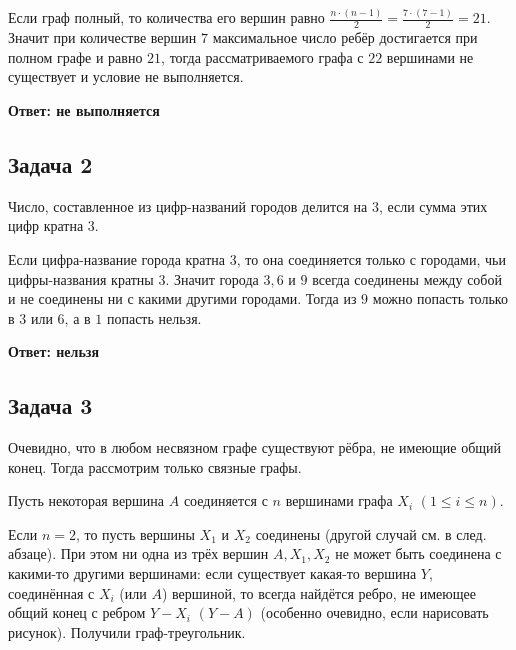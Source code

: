 \documentclass[a4paper,14pt]{article} %
\begin{document}
Если граф полный, то количества его вершин равно $\frac{n\cdot (n-1)}{2} = \frac{7\cdot (7-1)}{2} = 21$. Значит при количестве вершин $7$ максимальное число ребёр достигается при полном графе и равно $21$, тогда рассматриваемого графа с $22$ вершинами не существует и условие не выполняется.

\begin{flushright}
\begin{large}
\textbf {Ответ: не выполняется}
\end{large}
\end{flushright}

\begin{center}
\subsection{Задача 2}
\end{center}

Число, составленное из цифр-названий городов делится на $3$, если сумма этих цифр кратна 3.

Если цифра-название города кратна $3$, то она соединяется только с городами, чьи цифры-названия кратны 3. Значит города $3, 6$ и $9$ всегда соединены между собой и не соединены ни с какими другими городами. Тогда из $9$ можно попасть только в $3$ или $6$, а в $1$ попасть нельзя.

\begin{flushright}
\begin{large}
\textbf {Ответ: нельзя}
\end{large}
\end{flushright}
\newpage
\begin{center}
\subsection{Задача 3}
\end{center}

Очевидно, что в любом несвязном графе существуют рёбра, не имеющие общий конец. Тогда рассмотрим только связные графы.

Пусть некоторая вершина $A$ соединяется с $n$ вершинами графа $X_i$ $(1 \leqslant i \leqslant n)$.

Если $n = 2$, то пусть вершины $X_1$ и $X_2$ соединены (другой случай см. в след. абзаце). При этом ни одна из трёх вершин $A, X_1, X_2$ не может быть соединена с какими-то другими вершинами: если существует какая-то вершина $Y$, соединённая с $X_i$ (или $A$) вершиной, то всегда найдётся ребро, не имеющее общий конец с ребром $Y-X_i$ $(Y-A)$ (особенно очевидно, если нарисовать рисунок). Получили граф-треугольник.
\end{document}
